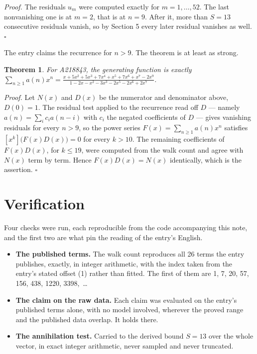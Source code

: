 \documentclass[11pt]{article}
\newtheorem{theorem}{Theorem}
\theoremstyle{definition}
\begin{document}
{\itshape Proof.} The residuals $u_m$ were computed exactly for $m = 1,\dots,52$. The last nonvanishing one is at $m = 2$, that is at $n = 9$. After it, more than $S = 13$ consecutive residuals vanish, so by Section 5 every later residual vanishes as well. $\square$

The entry claims the recurrence for $n > 9$. The theorem is at least as strong.

\begin{theorem} For A218843, the generating function is exactly $\sum_{n\ge 1} a(n)x^n = \frac{x + 5x^{2} + 5x^{3} + 7x^{4} + x^{5} + 7x^{6} + x^{7} - 2x^{9}}{1 - 2x - x^{2} - 3x^{3} - 2x^{5} - 2x^{6} + 2x^{7}}$.\end{theorem}

{\itshape Proof.} Let $N(x)$ and $D(x)$ be the numerator and denominator above, $D(0)=1$. The residual test applied to the recurrence read off $D$ --- namely $a(n) = \sum_i c_i a(n-i)$ with $c_i$ the negated coefficients of $D$ --- gives vanishing residuals for every $n > 9$, so the power series $F(x)=\sum_{n\ge 1}a(n)x^n$ satisfies $[x^k]\bigl(F(x)D(x)\bigr) = 0$ for every $k > 10$. The remaining coefficients of $F(x)D(x)$, for $k \le 19$, were computed from the walk count and agree with $N(x)$ term by term. Hence $F(x)D(x) = N(x)$ identically, which is the assertion. $\square$

\section{Verification}

Four checks were run, each reproducible from the code accompanying this note, and the first two are what pin the reading of the entry's English.

\begin{itemize}

\item {\bfseries The published terms.} The walk count reproduces all 26 terms the entry publishes, exactly, in integer arithmetic, with the index taken from the entry's stated offset (1) rather than fitted. The first of them are 1, 7, 20, 57, 156, 438, 1220, 3398,~\dots

\item {\bfseries The claim on the raw data.} Each claim was evaluated on the entry's published terms alone, with no model involved, wherever the proved range and the published data overlap. It holds there.

\item {\bfseries The annihilation test.} Carried to the derived bound $S = 13$ over the whole vector, in exact integer arithmetic, never sampled and never truncated.

\end{itemize}
\end{document}
